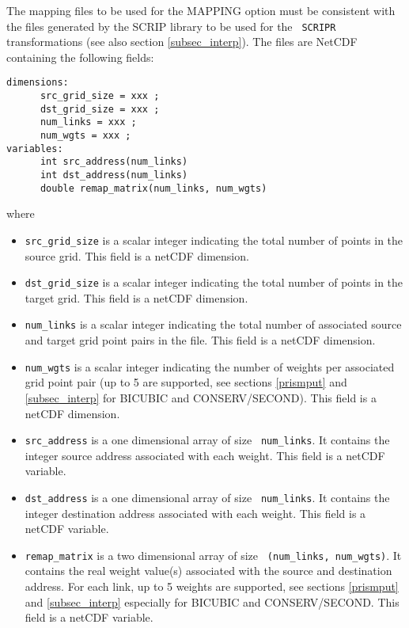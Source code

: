The mapping files to be used for the MAPPING option must be consistent
with the files generated by the SCRIP library to be used for the {\tt
  SCRIPR} transformations (see also section \ref{subsec_interp}). The
files are NetCDF containing the following fields:
\begin{verbatim}
dimensions:
      src_grid_size = xxx ;
      dst_grid_size = xxx ;
      num_links = xxx ;
      num_wgts = xxx ;
variables:
      int src_address(num_links) 
      int dst_address(num_links) 
      double remap_matrix(num_links, num_wgts) 
\end{verbatim}
where
\begin{itemize}
\item {\tt src\_grid\_size} is a scalar integer indicating the total number
  of points in the source grid.  
  This field is a netCDF dimension.
\item {\tt dst\_grid\_size} is a scalar integer indicating the total number
  of points in the target grid.  
  This field is a netCDF dimension.
\item {\tt num\_links} is a scalar integer indicating the total number
  of associated source and target grid point pairs in the file.  This field is a netCDF dimension.
\item {\tt num\_wgts} is a scalar integer indicating the number of
  weights per associated grid point pair (up to 5 are supported, see
  sections \ref{prismput} and \ref{subsec_interp} for BICUBIC and CONSERV/SECOND). 
  This field is a netCDF dimension.
\item {\tt src\_address} is a one dimensional array of size {\tt
    num\_links}.  It contains the integer source address associated
  with each weight.  This field is a netCDF variable.
\item {\tt dst\_address} is a one dimensional array of size {\tt
    num\_links}.  It contains the integer destination address
  associated with each weight.  This field is a netCDF variable.
\item {\tt remap\_matrix} is a two dimensional array of size {\tt
    (num\_links, num\_wgts)}.  It contains the real weight value(s)
  associated with the source and destination address. For each link, 
  up to 5 weights are supported, see sections \ref{prismput} and \ref{subsec_interp} 
  especially for BICUBIC and CONSERV/SECOND. This field is a netCDF variable.
\end{itemize}
